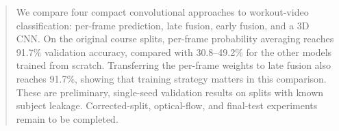 \begin{abstract}
We compare four compact convolutional approaches to workout-video
classification: per-frame prediction, late fusion, early fusion, and a 3D CNN.
On the original course splits, per-frame probability averaging reaches
91.7\% validation accuracy, compared with 30.8--49.2\% for the other
models trained from scratch. Transferring the per-frame weights to late
fusion also reaches 91.7\%, showing that training strategy matters in this
comparison. These are preliminary, single-seed validation results on splits
with known subject leakage. Corrected-split, optical-flow, and final-test
experiments remain to be completed.
\end{abstract}

